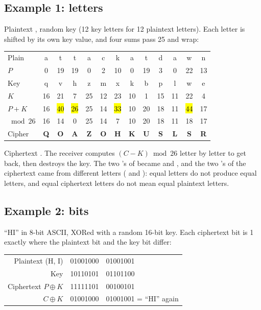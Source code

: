 \subsection{Example 1: letters}
Plaintext , random key  (12 key letters for 12 plaintext letters). Each letter is shifted by its own key value, and four sums pass 25 and wrap:
\begin{center}\small\setlength{\tabcolsep}{4.5pt}
\begin{tabular}{@{}l*{12}{c}@{}}
\toprule
Plain & a&t&t&a&c&k&a&t&d&a&w&n\\
$P$ & 0&19&19&0&2&10&0&19&3&0&22&13\\
Key & q&v&h&z&m&x&k&b&p&l&w&e\\
$K$ & 16&21&7&25&12&23&10&1&15&11&22&4\\
$P+K$ & 16&\hl{40}&\hl{26}&25&14&\hl{33}&10&20&18&11&\hl{44}&17\\
$\bmod 26$ & 16&14&0&25&14&7&10&20&18&11&18&17\\
Cipher & \textbf{Q}&\textbf{O}&\textbf{A}&\textbf{Z}&\textbf{O}&\textbf{H}&\textbf{K}&\textbf{U}&\textbf{S}&\textbf{L}&\textbf{S}&\textbf{R}\\
\bottomrule
\end{tabular}
\end{center}
Ciphertext \textbf{}. The receiver computes $(C - K) \bmod 26$ letter by letter to get  back, then destroys the key. The two 's of  became  and , and the two 's of the ciphertext came from different letters ( and ): equal letters do not produce equal letters, and equal ciphertext letters do not mean equal plaintext letters.

\subsection{Example 2: bits}
``HI'' in 8-bit ASCII, XORed with a random 16-bit key. Each ciphertext bit is 1 exactly where the plaintext bit and the key bit differ:
\begin{center}\small\ttfamily
\begin{tabular}{@{}r@{\quad}l@{\quad}l@{}}
\rmfamily Plaintext (H, I) & 01001000 & 01001001\\
\rmfamily Key & 10110101 & 01101100\\
\midrule
\rmfamily Ciphertext $P\oplus K$ & 11111101 & 00100101\\
\rmfamily $C \oplus K$ & 01001000 & 01001001 \rmfamily\;= ``HI'' again\\
\end{tabular}
\end{center}

